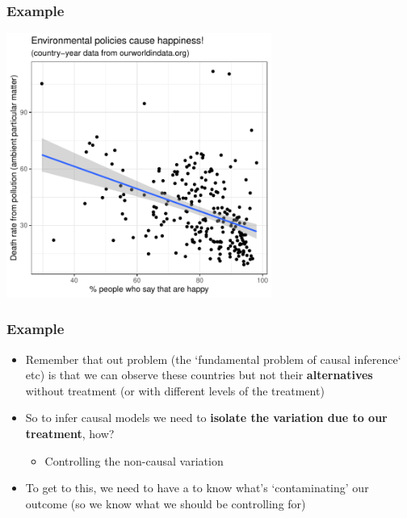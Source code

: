 \documentclass[aspectratio=43]{beamer}
\begin{document}
\begin{frame}
\frametitle{Example}
\centering

\includegraphics[width = 0.65\textwidth]{../img/happiness_pollution}

\end{frame}

\begin{frame}
\frametitle{Example}
\centering

\begin{itemize}
  \item Remember that out problem (the `fundamental problem of causal inference` etc) is that we can observe these countries but not their \textbf{alternatives} without treatment (or with different levels of the treatment)
  \item So to infer causal models we need to \textbf{isolate the variation due to our treatment}, how?
  \begin{itemize}
    \item Controlling the non-causal variation
  \end{itemize}
  \item To get to this, we need to have a  to know what's `contaminating' our outcome (so we know what we should be controlling for)
\end{itemize}

\end{frame}
\end{document}
